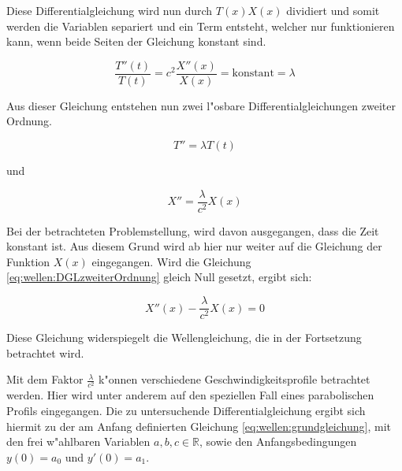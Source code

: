 Diese Differentialgleichung wird nun durch $T(x)X(x)$ dividiert und somit 
werden die Variablen separiert und ein Term entsteht, welcher nur funktionieren 
kann, wenn beide Seiten der Gleichung konstant sind. 

\begin{equation*}
	\frac{T''(t)}{T(t)}
	=
	c^2 \frac{X''(x)}{X(x)} = \text{konstant} = \lambda
\end{equation*}

Aus dieser Gleichung entstehen nun zwei l"osbare Differentialgleichungen 
zweiter Ordnung.

\begin{equation*}
	T''= \lambda T(t)
\end{equation*}

und

\begin{equation}
	X'' = \frac{\lambda}{c^2}X(x)
	\label{eq:wellen:DGLzweiterOrdnung}
\end{equation}

Bei der betrachteten Problemstellung, wird davon ausgegangen, dass die 
Zeit konstant ist. Aus diesem Grund wird ab hier nur weiter auf die Gleichung 
der Funktion $X(x)$ eingegangen. Wird die Gleichung 
\ref{eq:wellen:DGLzweiterOrdnung} gleich Null gesetzt, ergibt sich:

\begin{equation*}
	X''(x) - \frac{\lambda}{c^2} X(x) = 0
\end{equation*}

Diese Gleichung widerspiegelt die Wellengleichung, die in der Fortsetzung 
betrachtet wird.

Mit dem Faktor $\frac{\lambda}{c^2}$ k"onnen verschiedene 
Geschwindigkeitsprofile betrachtet werden. Hier wird unter anderem auf den 
speziellen Fall eines parabolischen Profils eingegangen. Die zu untersuchende 
Differentialgleichung ergibt sich hiermit zu der am Anfang definierten 
Gleichung \ref{eq:wellen:grundgleichung}, mit den frei w"ahlbaren Variablen 
${a,b,c} \in \mathbb{R}$, sowie den Anfangsbedingungen $y(0) = a_0$ und $y'(0) 
= a_1$.